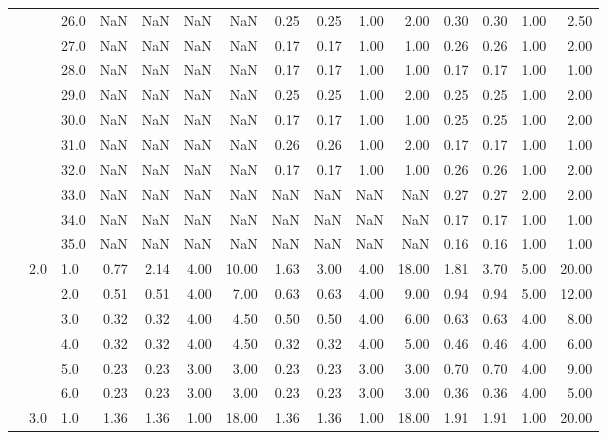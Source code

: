 \begin{tabular}{lllrrrrrrrrrrrr}
       &     & 26.0 &        NaN &       NaN &  NaN &    NaN &       0.25 &      0.25 & 1.00 &   2.00 &       0.30 &      0.30 & 1.00 &   2.50 \\
       &     & 27.0 &        NaN &       NaN &  NaN &    NaN &       0.17 &      0.17 & 1.00 &   1.00 &       0.26 &      0.26 & 1.00 &   2.00 \\
       &     & 28.0 &        NaN &       NaN &  NaN &    NaN &       0.17 &      0.17 & 1.00 &   1.00 &       0.17 &      0.17 & 1.00 &   1.00 \\
       &     & 29.0 &        NaN &       NaN &  NaN &    NaN &       0.25 &      0.25 & 1.00 &   2.00 &       0.25 &      0.25 & 1.00 &   2.00 \\
       &     & 30.0 &        NaN &       NaN &  NaN &    NaN &       0.17 &      0.17 & 1.00 &   1.00 &       0.25 &      0.25 & 1.00 &   2.00 \\
       &     & 31.0 &        NaN &       NaN &  NaN &    NaN &       0.26 &      0.26 & 1.00 &   2.00 &       0.17 &      0.17 & 1.00 &   1.00 \\
       &     & 32.0 &        NaN &       NaN &  NaN &    NaN &       0.17 &      0.17 & 1.00 &   1.00 &       0.26 &      0.26 & 1.00 &   2.00 \\
       &     & 33.0 &        NaN &       NaN &  NaN &    NaN &        NaN &       NaN &  NaN &    NaN &       0.27 &      0.27 & 2.00 &   2.00 \\
       &     & 34.0 &        NaN &       NaN &  NaN &    NaN &        NaN &       NaN &  NaN &    NaN &       0.17 &      0.17 & 1.00 &   1.00 \\
       &     & 35.0 &        NaN &       NaN &  NaN &    NaN &        NaN &       NaN &  NaN &    NaN &       0.16 &      0.16 & 1.00 &   1.00 \\
       & 2.0 & 1.0  &       0.77 &      2.14 & 4.00 &  10.00 &       1.63 &      3.00 & 4.00 &  18.00 &       1.81 &      3.70 & 5.00 &  20.00 \\
       &     & 2.0  &       0.51 &      0.51 & 4.00 &   7.00 &       0.63 &      0.63 & 4.00 &   9.00 &       0.94 &      0.94 & 5.00 &  12.00 \\
       &     & 3.0  &       0.32 &      0.32 & 4.00 &   4.50 &       0.50 &      0.50 & 4.00 &   6.00 &       0.63 &      0.63 & 4.00 &   8.00 \\
       &     & 4.0  &       0.32 &      0.32 & 4.00 &   4.50 &       0.32 &      0.32 & 4.00 &   5.00 &       0.46 &      0.46 & 4.00 &   6.00 \\
       &     & 5.0  &       0.23 &      0.23 & 3.00 &   3.00 &       0.23 &      0.23 & 3.00 &   3.00 &       0.70 &      0.70 & 4.00 &   9.00 \\
       &     & 6.0  &       0.23 &      0.23 & 3.00 &   3.00 &       0.23 &      0.23 & 3.00 &   3.00 &       0.36 &      0.36 & 4.00 &   5.00 \\
       & 3.0 & 1.0  &       1.36 &      1.36 & 1.00 &  18.00 &       1.36 &      1.36 & 1.00 &  18.00 &       1.91 &      1.91 & 1.00 &  20.00 \\
\bottomrule
\end{tabular}
